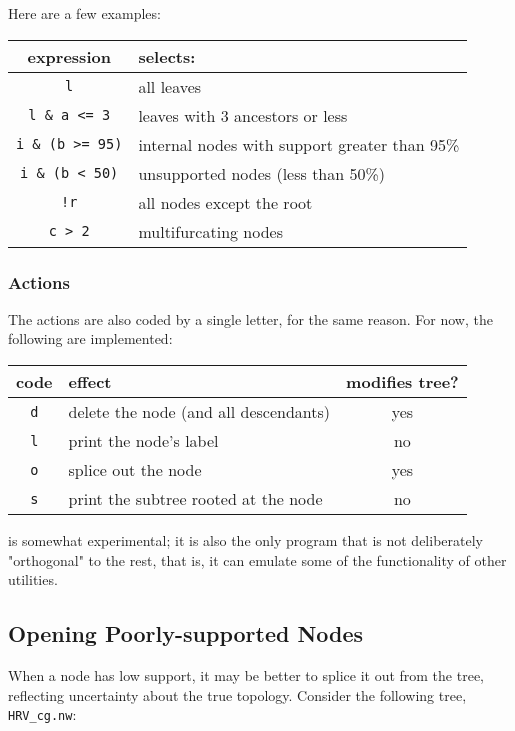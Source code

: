 \noindent{}Here are a few examples:

\begin{center}
\begin{tabular}{cl}
expression & selects: \\
\hline
\texttt{l} & all leaves \\
\texttt{l \& a <= 3} & leaves with 3 ancestors or less \\
\texttt{i \& (b >= 95)} & internal nodes with support greater than 95\% \\ 
\texttt{i \& (b < 50)} & unsupported nodes (less than 50\%) \\
\texttt{!r} & all nodes except the root \\
\texttt{c > 2} & multifurcating nodes
\end{tabular}
\end{center}

\subsubsection{Actions}

The actions are also coded by a single letter, for the same reason. For now,
the following are implemented:

\begin{center}
\begin{tabular}{clc}
code & effect & modifies tree?\\
\hline
\texttt{d} & delete the node (and all descendants) & yes \\
\texttt{l} & print the node's label & no \\
\texttt{o} & splice out the node & yes \\
\texttt{s} & print the subtree rooted at the node & no \\
\end{tabular}
\end{center}

\ed{} is somewhat experimental; it is also the only program that is not
deliberately "orthogonal" to the rest, that is, it can emulate some of the
functionality of other utilities.

\subsection{Opening Poorly-supported Nodes}
\label{sct:ed_ed}

When a node has low support, it may be better to splice it out from the tree,
reflecting uncertainty about the true topology. Consider the following tree, 
\texttt{HRV\_cg.nw}:

